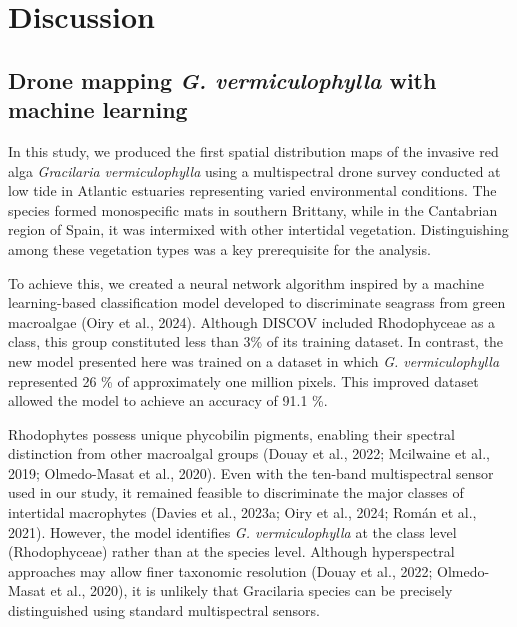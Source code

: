 \documentclass[
  letterpaper,
  11pt,
  english,
  singlespacing,
  headsepline]{MastersDoctoralThesis}
\begin{document}
\begin{spacing}{1.5}
\begin{figure}
\end{figure}%

\section{Discussion}\label{discussion-2}

\subsection{\texorpdfstring{Drone mapping \emph{G. vermiculophylla} with
machine
learning}{Drone mapping G. vermiculophylla with machine learning}}\label{drone-mapping-g.-vermiculophylla-with-machine-learning}

In this study, we produced the first spatial distribution maps of the
invasive red alga \emph{Gracilaria vermiculophylla} using a
multispectral drone survey conducted at low tide in Atlantic estuaries
representing varied environmental conditions. The species formed
monospecific mats in southern Brittany, while in the Cantabrian region
of Spain, it was intermixed with other intertidal vegetation.
Distinguishing among these vegetation types was a key prerequisite for
the analysis.

To achieve this, we created a neural network algorithm inspired by a
machine learning-based classification model developed to discriminate
seagrass from green macroalgae (Oiry et al., 2024). Although DISCOV
included Rhodophyceae as a class, this group constituted less than 3\%
of its training dataset. In contrast, the new model presented here was
trained on a dataset in which \emph{G. vermiculophylla} represented 26
\% of approximately one million pixels. This improved dataset allowed
the model to achieve an accuracy of 91.1 \%.

Rhodophytes possess unique phycobilin pigments, enabling their spectral
distinction from other macroalgal groups (Douay et al., 2022; Mcilwaine
et al., 2019; Olmedo-Masat et al., 2020). Even with the ten-band
multispectral sensor used in our study, it remained feasible to
discriminate the major classes of intertidal macrophytes (Davies et al.,
2023a; Oiry et al., 2024; Román et al., 2021). However, the model
identifies \emph{G. vermiculophylla} at the class level (Rhodophyceae)
rather than at the species level. Although hyperspectral approaches may
allow finer taxonomic resolution (Douay et al., 2022; Olmedo-Masat et
al., 2020), it is unlikely that Gracilaria species can be precisely
distinguished using standard multispectral sensors.


\end{spacing}
\end{document}
